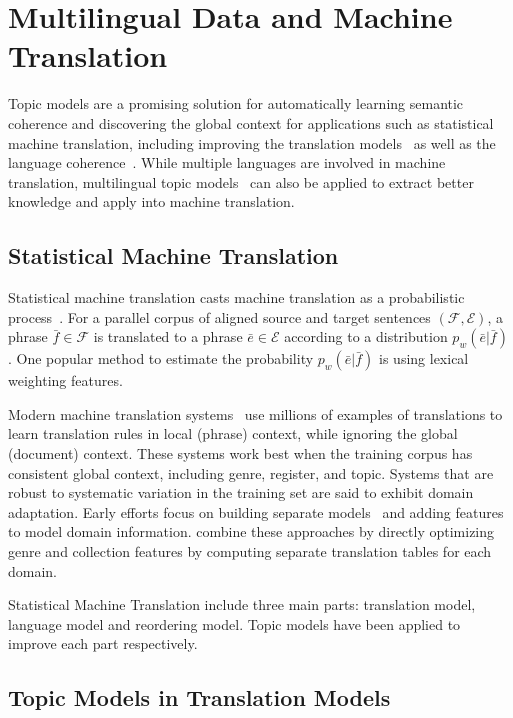 \chapter{Multilingual Data and Machine Translation}
\label{ch:mt}

Topic models are a promising solution for automatically learning semantic coherence and discovering the global context for applications such as statistical machine translation, including improving the translation models~\citep{Eidelman-12,hu-14,zhao-06,xiao-12,xiong-13} as well as the language coherence~\citep{Bellegarda-04,wood-09}. 
While multiple languages are involved in machine translation, multilingual topic models~\citep{mimno-09,boyd-graber-10} can also be applied to extract better knowledge and apply into machine translation.

\section{Statistical Machine Translation}

Statistical machine translation casts machine translation as a probabilistic process~\citep{koehn-09}. For a parallel corpus of aligned source and target sentences $(\mathcal{F}, \mathcal{E})$, a phrase $\bar{f} \in \mathcal{F}$ is translated to a phrase $\bar{e} \in \mathcal{E}$ according to a distribution $p_w(\bar{e}|\bar{f})$.
One popular method to estimate the probability $p_w(\bar{e}|\bar{f})$ is using lexical weighting features.

Modern machine translation systems~\citep{koehn-09} use millions of examples of translations to learn translation rules in local (phrase) context, while ignoring the global (document) context. These systems work best when the training corpus has consistent global context, including genre, register, and topic. Systems that are robust to systematic variation in the training set are said to exhibit domain adaptation. Early efforts focus on building separate models~\citep{foster-07} and adding features~\citep{matsoukas-09} to model domain information.  \citet{chiang-11} combine these approaches by directly optimizing genre and collection features by computing separate translation tables for each domain.

Statistical Machine Translation include three main parts: translation model, language model and reordering model. Topic models have been applied to improve each part respectively.

\section{Topic Models in Translation Models}

